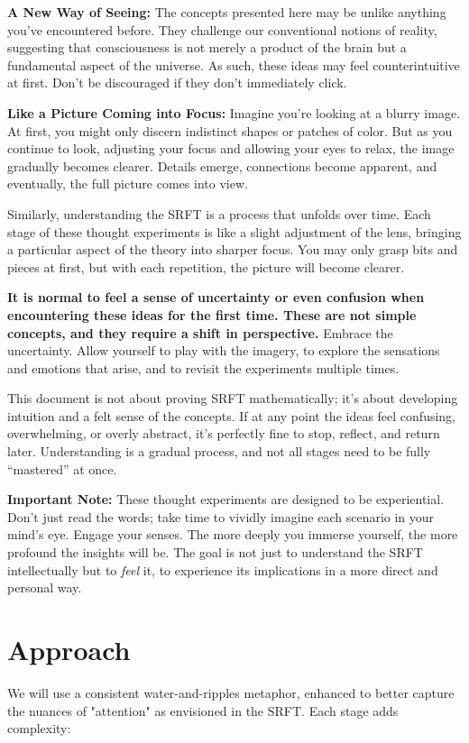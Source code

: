 \documentclass[12pt,a4paper]{article}
\begin{document}
\textbf{A New Way of Seeing:} The concepts presented here may be unlike anything you've encountered before. They challenge our conventional notions of reality, suggesting that consciousness is not merely a product of the brain but a fundamental aspect of the universe. As such, these ideas may feel counterintuitive at first. Don't be discouraged if they don't immediately click.

\textbf{Like a Picture Coming into Focus:}  Imagine you're looking at a blurry image. At first, you might only discern indistinct shapes or patches of color. But as you continue to look, adjusting your focus and allowing your eyes to relax, the image gradually becomes clearer. Details emerge, connections become apparent, and eventually, the full picture comes into view.

Similarly, understanding the SRFT is a process that unfolds over time. Each stage of these thought experiments is like a slight adjustment of the lens, bringing a particular aspect of the theory into sharper focus. You may only grasp bits and pieces at first, but with each repetition, the picture will become clearer.

\textbf{It is normal to feel a sense of uncertainty or even confusion when encountering these ideas for the first time. These are not simple concepts, and they require a shift in perspective.} Embrace the uncertainty. Allow yourself to play with the imagery, to explore the sensations and emotions that arise, and to revisit the experiments multiple times.

This document is not about proving SRFT mathematically; it's about developing intuition and a felt sense of the concepts. If at any point the ideas feel confusing, overwhelming, or overly abstract, it's perfectly fine to stop, reflect, and return later. Understanding is a gradual process, and not all stages need to be fully ``mastered'' at once.

\textbf{Important Note:} These thought experiments are designed to be experiential. Don't just read the words; take time to vividly imagine each scenario in your mind's eye. Engage your senses. The more deeply you immerse yourself, the more profound the insights will be. The goal is not just to understand the SRFT intellectually but to \textit{feel} it, to experience its implications in a more direct and personal way.

\section*{Approach}
We will use a consistent water-and-ripples metaphor, enhanced to better capture the nuances of "attention" as envisioned in the SRFT. Each stage adds complexity:
\end{document}
